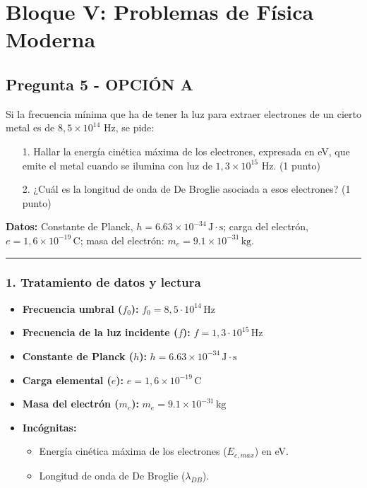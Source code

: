 \newpage

\section{Bloque V: Problemas de Física Moderna}
\label{sec:moderna_2002_jun_ord}

\subsection{Pregunta 5 - OPCIÓN A}
\label{subsec:5A_2002_jun_ord}

\begin{cajaenunciado}
Si la frecuencia mínima que ha de tener la luz para extraer electrones de un cierto metal es de $8,5\times10^{14}$ Hz, se pide:
\begin{enumerate}
    \item[1.] Hallar la energía cinética máxima de los electrones, expresada en eV, que emite el metal cuando se ilumina con luz de $1,3\times10^{15}$ Hz. (1 punto)
    \item[2.] ¿Cuál es la longitud de onda de De Broglie asociada a esos electrones? (1 punto)
\end{enumerate}
\textbf{Datos:} Constante de Planck, $h=6.63\times10^{-34}\,\text{J}\cdot\text{s}$; carga del electrón, $e=1,6\times10^{-19}\,\text{C}$; masa del electrón: $m_e=9.1\times10^{-31}\,\text{kg}$.
\end{cajaenunciado}
\hrule

\subsubsection*{1. Tratamiento de datos y lectura}
\begin{itemize}
    \item \textbf{Frecuencia umbral ($f_0$):} $f_0 = 8,5 \cdot 10^{14} \, \text{Hz}$
    \item \textbf{Frecuencia de la luz incidente ($f$):} $f = 1,3 \cdot 10^{15} \, \text{Hz}$
    \item \textbf{Constante de Planck ($h$):} $h=6.63\times10^{-34}\,\text{J}\cdot\text{s}$
    \item \textbf{Carga elemental ($e$):} $e=1,6\times10^{-19}\,\text{C}$
    \item \textbf{Masa del electrón ($m_e$):} $m_e=9.1\times10^{-31}\,\text{kg}$
    \item \textbf{Incógnitas:}
        \begin{itemize}
            \item Energía cinética máxima de los electrones ($E_{c,max}$) en eV.
            \item Longitud de onda de De Broglie ($\lambda_{DB}$).
        \end{itemize}
\end{itemize}

